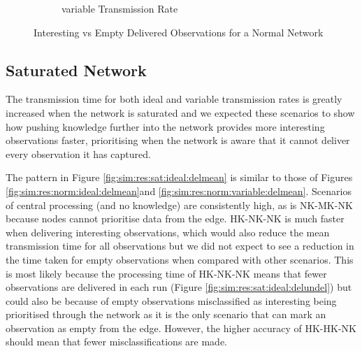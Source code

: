 \begin{figure}[H]
\begin{subfigure}{.5\textwidth}
  \caption{variable Transmission Rate}
	\label{fig:sim:res:norm:variable:emptint}
\end{subfigure}
\caption{Interesting vs Empty Delivered Observations for a Normal Network}
\end{figure}

\subsection{Saturated Network}
The transmission time for both ideal and variable transmission rates is greatly increased when the network is saturated and we expected these scenarios to show how pushing knowledge further into the network provides more interesting observations faster, prioritising when the network is aware that it cannot deliver every observation it has captured.

	The pattern in Figure \ref{fig:sim:res:sat:ideal:delmean} is similar to those of Figures \ref{fig:sim:res:norm:ideal:delmean}and \ref{fig:sim:res:norm:variable:delmean}. Scenarios of central processing (and no knowledge) are consistently high, as is NK-MK-NK because nodes cannot prioritise data from the edge. HK-NK-NK is much faster when delivering interesting observations, which would also reduce the mean transmission time for all observations but we did not expect to see a reduction in the time taken for empty observations when compared with other scenarios. This is most likely because the processing time of HK-NK-NK means that fewer observations are delivered in each run (Figure \ref{fig:sim:res:sat:ideal:delundel}) but could also be because of empty observations misclassified as interesting being prioritised through the network as it is the only scenario that can mark an observation as empty from the edge. However, the higher accuracy of HK-HK-NK should mean that fewer misclassifications are made. 
	

